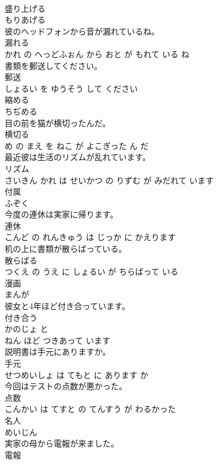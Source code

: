 \documentclass[8pt]{extreport}
\begin{document}
\begin{CJK}{UTF8}{min}
\\	盛り上げる	
\\	もりあげる		
\\	彼のヘッドフォンから音が漏れているね。	
\\	漏れる 
\\	かれ の へっどふぉん から おと が もれて いる ね			
\\	書類を郵送してください。	
\\	郵送 
\\	しょるい を ゆうそう して ください			
\\	縮める	
\\	ちぢめる		
\\	目の前を猫が横切ったんだ。	
\\	横切る 
\\	め の まえ を ねこ が よこぎった ん だ			
\\	最近彼は生活のリズムが乱れています。	
\\	リズム 
\\	さいきん かれ は せいかつ の りずむ が みだれて います			
\\	付属	
\\	ふぞく		
\\	今度の連休は実家に帰ります。	
\\	連休 
\\	こんど の れんきゅう は じっか に かえります			
\\	机の上に書類が散らばっている。	
\\	散らばる 
\\	つくえ の うえ に しょるい が ちらばって いる			
\\	漫画	
\\	まんが		
\\	彼女と4年ほど付き合っています。	
\\	付き合う 
\\	かのじょ と 
\\	ねん ほど つきあって います			
\\	説明書は手元にありますか。	
\\	手元 
\\	せつめいしょ は てもと に あります か			
\\	今回はテストの点数が悪かった。	
\\	点数 
\\	こんかい は てすと の てんすう が わるかった			
\\	名人	
\\	めいじん		
\\	実家の母から電報が来ました。	
\\	電報 

\end{CJK}
\end{document}
